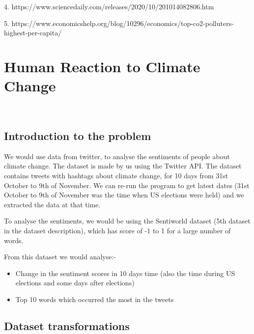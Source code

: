 \documentclass[a4paper, 11pt]{report}
\begin{document}
     4. https://www.sciencedaily.com/releases/2020/10/201014082806.htm

     5. https://www.economicshelp.org/blog/10296/economics/top-co2-polluters-highest-per-capita/


\newpage

\section{Human Reaction to Climate Change}
~

\subsection{Introduction to the problem}

\normalsize
We would use data from twitter, to analyse the sentiments of people about climate change. The dataset is made by us using the Twitter API. The dataset contains tweets with hashtags about climate change, for 10 days from 31st October to 9th of November. We can re-run the program to get latest dates (31st October to 9th of November was the time when US elections were held) and we extracted the data at that time.

To analyse the sentiments, we would be using the Sentiworld dataset (5th dataset in the dataset description), which has score of -1 to 1 for a large number of words.

From this dataset we would analyse:-

\begin{itemize}
    \item Change in the sentiment scores in 10 days time (also the time during US elections and some days after elections)

    \item Top 10 words which occurred the most in the tweets
\end{itemize}



\subsection{Dataset transformations}
\end{document}
